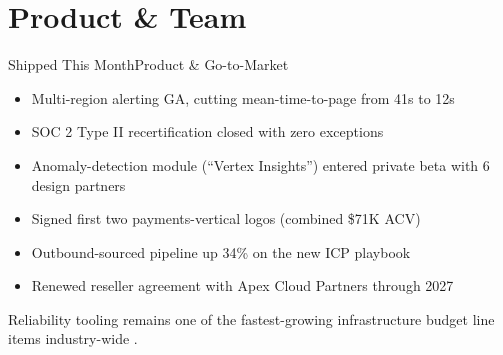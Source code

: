 \section{Product \& Team}

\begin{frame}{Shipped This Month}{Product \& Go-to-Market}

  \begin{minipage}{0.48\textwidth}
    \begin{panelbox}[title={\textcolor{accent}{\faFile}\ \ Product}]
      \small
      \begin{itemize}
        \setlength{\itemsep}{3pt}
        \item Multi-region alerting GA, cutting mean-time-to-page from 41s to 12s
        \item SOC 2 Type II recertification closed with zero exceptions
        \item Anomaly-detection module (``Vertex Insights'') entered private beta with 6 design partners
      \end{itemize}
    \end{panelbox}
  \end{minipage}\hfill
  \begin{minipage}{0.48\textwidth}
    \begin{panelbox}[title={\textcolor{accent}{\faChartLine}\ \ Go-to-Market}]
      \small
      \begin{itemize}
        \setlength{\itemsep}{3pt}
        \item Signed first two payments-vertical logos (combined \$71K ACV)
        \item Outbound-sourced pipeline up 34\% on the new ICP playbook
        \item Renewed reseller agreement with Apex Cloud Partners through 2027
      \end{itemize}
    \end{panelbox}
  \end{minipage}
  \par

  \vspace{0.2cm}
  {\scriptsize\textcolor{textMuted}{Reliability tooling remains one of the fastest-growing infrastructure budget line items industry-wide \cite{meridian2026infraspend}.}}

\end{frame}

